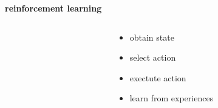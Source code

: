 \documentclass[xcolor=dvipsnames]{beamer}
\begin{document}
\begin{frame}{\bf reinforcement learning}

  \begin{columns}

    \begin{column}{0.5\textwidth}
    \end{column}

    \begin{column}{0.5\textwidth}
      \begin{itemize}
        \item obtain state
        \item select action
        \item exectute action
        \item learn from experiences
      \end{itemize}
    \end{column}

  \end{columns}

\end{frame}
\end{document}
